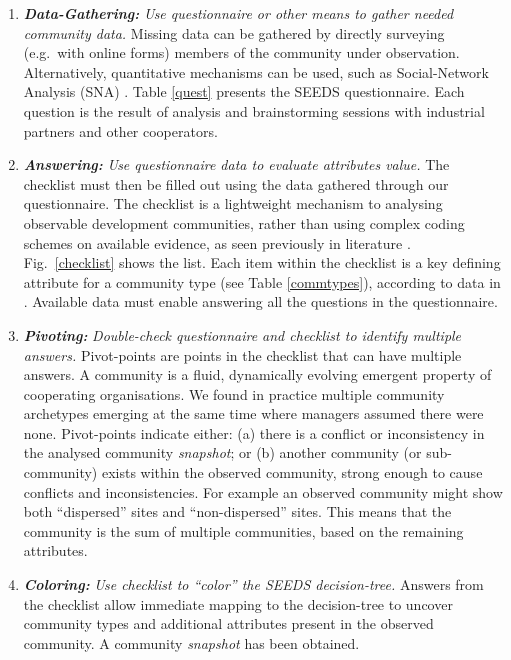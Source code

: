 \begin{enumerate}

\item \emph{\bf Data-Gathering:} \emph{Use questionnaire or other means to gather needed community data.}
Missing data can be gathered by directly surveying (e.g.~with online forms) members of the community under observation. Alternatively, quantitative mechanisms can be used, such as Social-Network Analysis (SNA) \cite{Rosso2009}. Table \ref{quest} presents the SEEDS questionnaire. Each question is the result of analysis and brainstorming sessions with industrial partners and other cooperators. 

\item \emph{\bf Answering:} \emph{Use questionnaire data to evaluate attributes value.}
The checklist must then be filled out using the data gathered through our questionnaire. The checklist is a lightweight mechanism to analysing observable development communities, rather than using complex coding schemes on available evidence, as seen previously in literature \cite{Rosso2009,Hustad2010}. Fig.~\ref{checklist} shows the list. Each item within the checklist is a key defining attribute for a community type (see Table \ref{commtypes}), according to data in \cite{ossslr}. Available data must enable answering all the questions in the questionnaire.

\item \emph{\bf Pivoting:} \emph{Double-check questionnaire and checklist to identify multiple answers.}
Pivot-points are points in the checklist that can have multiple answers. A community is a fluid, dynamically evolving emergent property of cooperating organisations. We found in practice multiple community archetypes emerging at the same time where managers assumed there were none. Pivot-points indicate either: (a) there is a conflict or inconsistency in the analysed community \emph{snapshot}; or (b) another community (or sub-community) exists within the observed community, strong enough to cause conflicts and inconsistencies. For example an observed community might show both ``dispersed'' sites and ``non-dispersed'' sites. This means that the community is the sum of multiple communities, based on the remaining attributes.

\item \emph{\bf Coloring:} \emph{Use checklist to ``color'' the SEEDS decision-tree.}
Answers from the checklist allow immediate mapping to the decision-tree to uncover community types and additional attributes present in the observed community. A community \emph{snapshot} has been obtained.


\end{enumerate}
